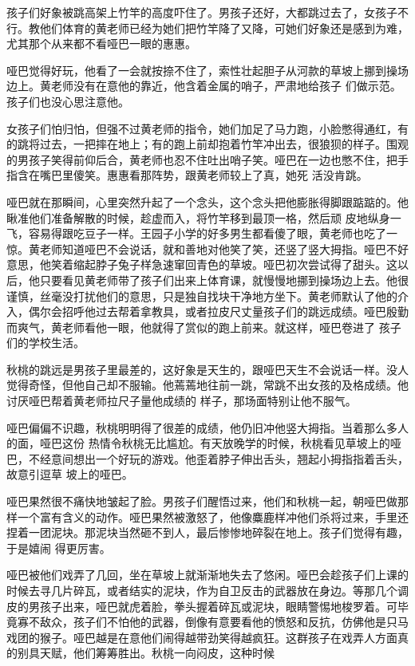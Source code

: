\documentclass{article}
\begin{document}
\newpage

孩子们好象被跳高架上竹竿的高度吓住了。男孩子还好，大都跳过去了，女孩子不行。教他们体育的黄老师已经为她们把竹竿降了又降，可她们好象还是感到为难，尤其那个从来都不看哑巴一眼的惠惠。

哑巴觉得好玩，他看了一会就按捺不住了，索性壮起胆子从河款的草坡上挪到操场边上。黄老师没有在意他的靠近，他含着金属的哨子，严肃地给孩子
们做示范。孩子们也没心思注意他。 

女孩子们怕归怕，但强不过黄老师的指令，她们加足了马力跑，小脸憋得通红，有的跳将过去，一把摔在地上；有的跑上前却抱着竹竿冲出去，很狼狈的样子。围观的男孩子笑得前仰后合，黄老师也忍不住吐出哨子笑。哑巴在一边也憋不住，把手指含在嘴巴里傻笑。惠惠看那阵势，跟黄老师较上了真，她死
活没肯跳。 

哑巴就在那瞬间，心里突然升起了一个念头，这个念头把他膨胀得脚跟踮踮的。他瞅准他们准备解散的时候，趁虚而入，将竹竿移到最顶一格，然后顽
\newpage
皮地纵身一飞，容易得跟吃豆子一样。王园子小学的好多男生都看傻了眼，黄老师也吃了一惊。黄老师知道哑巴不会说话，就和善地对他笑了笑，还竖了竖大拇指。哑巴不好意思，他笑着缩起脖子兔子样急速窜回青色的草坡。哑巴初次尝试得了甜头。这以后，他只要看见黄老师带了孩子们出来上体育课，就慢慢地挪到操场边上去。他很谨慎，丝毫没打扰他们的意思，只是独自找块干净地方坐下。黄老师默认了他的介入，偶尔会招呼他过去帮着拿教具，或者拉皮尺丈量孩子们的跳远成绩。哑巴殷勤而爽气，黄老师看他一眼，他就得了赏似的跑上前来。就这样，哑巴卷进了
孩子们的学校生活。 

秋桃的跳远是男孩子里最差的，这好象是天生的，跟哑巴天生不会说话一样。没人觉得奇怪，但他自己却不服输。他蔫蔫地往前一跳，常跳不出女孩的及格成绩。他讨厌哑巴帮着黄老师拉尺子量他成绩的
样子，那场面特别让他不服气。 

哑巴偏偏不识趣，秋桃明明得了很差的成绩，他仍旧冲他竖大拇指。当着那么多人的面，哑巴这份
\newpage
热情令秋桃无比尴尬。有天放晚学的时候，秋桃看见草坡上的哑巴，不经意间想出一个好玩的游戏。他歪着脖子伸出舌头，翘起小拇指指着舌头，故意引逗草
坡上的哑巴。 

哑巴果然很不痛快地皱起了脸。男孩子们醒悟过来，他们和秋桃一起，朝哑巴做那样一个富有含义的动作。哑巴果然被激怒了，他像麋鹿样冲他们杀将过来，手里还捏着一团泥块。那泥块当然砸不到人，最后惨惨地碎裂在地上。孩子们觉得有趣，于是嬉闹
得更厉害。 

哑巴被他们戏弄了几回，坐在草坡上就渐渐地失去了悠闲。哑巴会趁孩子们上课的时候去寻几片碎瓦，或者结实的泥块，作为自卫反击的武器放在身边。等那几个调皮的男孩子出来，哑巴就虎着脸，拳头握着碎瓦或泥块，眼睛警惕地梭罗着。可毕竟寡不敌众，孩子们不怕他的武器，倒像有意要看他的愤怒和反抗，仿佛他是只马戏团的猴子。哑巴越是在意他们闹得越带劲笑得越疯狂。这群孩子在戏弄人方面真的别具天赋，他们筹筹胜出。秋桃一向闷皮，这种时候
\newpage
\end{document}
